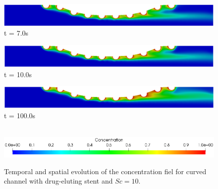 \begin{figure}[H]
     \begin{minipage}{.50\linewidth}
      \centering
      \includegraphics[scale=0.18]{./02_chaps/cap_solution/figure/conc10_CurvedStrut6.png}\\
      t = 7.0s
     \end{minipage}
     \begin{minipage}{.50\linewidth}
     \medskip
      \centering
      \includegraphics[scale=0.18]{./02_chaps/cap_solution/figure/conc10_CurvedStrut7.png}\\
      t = 10.0s
     \end{minipage}%
     \begin{minipage}{.50\linewidth}
     \medskip
      \centering
      \includegraphics[scale=0.18]{./02_chaps/cap_solution/figure/conc10_CurvedStrut8.png}\\
      t = 100.0s
     \end{minipage}\\[10pt]
      \centering
      \includegraphics[scale=0.5]{./02_chaps/cap_solution/figure/conc1_CurvedStrutScale.png}\\
     \medskip
    \caption{
Temporal and spatial evolution of the concentration fiel for curved channel with drug-eluting stent and $Sc=10$.}
     \label{conc field curved stent sc 10}
\end{figure}



